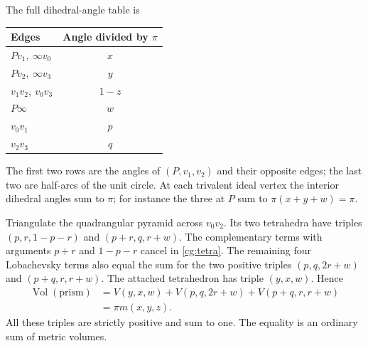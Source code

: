 \documentclass[11pt]{article}
\numberwithin{equation}{section}
\theoremstyle{definition}\newtheorem{definition}[theorem]{Definition}
\theoremstyle{remark}\newtheorem{remark}[theorem]{Remark}
\newcommand{\Vol}{\operatorname{Vol}}
\begin{document}
The full dihedral-angle table is
\begin{center}
\begin{tabular}{lc}
\toprule Edges & Angle divided by $\pi$\\ \midrule
$Pv_1,\ \infty v_0$ & $x$\\
$Pv_2,\ \infty v_3$ & $y$\\
$v_1v_2,\ v_0v_3$ & $1-z$\\
$P\infty$ & $w$\\
$v_0v_1$ & $p$\\
$v_2v_3$ & $q$\\ \bottomrule
\end{tabular}
\end{center}
The first two rows are the angles of $(P,v_1,v_2)$ and their
opposite edges; the last two are half-arcs of the unit circle.
At each trivalent ideal vertex the interior dihedral angles sum
to $\pi$; for instance the three at $P$ sum to
$\pi(x+y+w)=\pi$.

Triangulate the quadrangular pyramid across $v_0v_2$. Its two
tetrahedra have triples $(p,r,1-p-r)$ and $(p+r,q,r+w)$.
The complementary terms with arguments $p+r$ and $1-p-r$ cancel
in \eqref{cg:tetra}. The remaining four Lobachevsky terms also
equal the sum for the two positive triples
$(p,q,2r+w)$ and $(p+q,r,r+w)$.
The attached tetrahedron has triple $(y,x,w)$. Hence
\begin{equation}\label{cg:prism-volume}
\begin{split}
 \Vol(\text{prism})
 &=V(y,x,w)+V(p,q,2r+w)+V(p+q,r,r+w)\\
 &=\pi m(x,y,z).
\end{split}
\end{equation}
All these triples are strictly positive and sum to one. The
equality is an ordinary sum of metric volumes.




\end{document}
